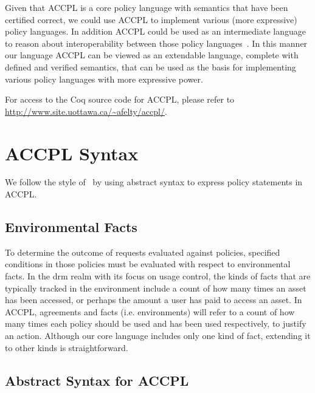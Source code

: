 \documentclass[runningheads,a4paper]{llncs}
\begin{document}
Given that \ac{ACCPL} is a core policy language with semantics that have been certified correct, we could use \ac{ACCPL} to implement various (more expressive) policy languages. In addition \ac{ACCPL} could be used as an intermediate language to reason about interoperability between those policy languages~\cite{prados2005interoperability,maronas2009architecture}. In this manner our language \ac{ACCPL} can be viewed as an extendable language, complete with defined and verified semantics, that can be used as the basis for implementing various policy languages with more expressive power. 

For access to the Coq source code for \ac{ACCPL}, please refer to \url{http://www.site.uottawa.ca/~afelty/accpl/}.

\section{ACCPL Syntax}

We follow the style of~\cite{pucella2006} by using abstract syntax to express policy statements in \ac{ACCPL}. 

\subsection{Environmental Facts}\label{sec:odrl0}
To determine the outcome of requests evaluated against policies,
specified conditions in those policies must be evaluated with respect
to environmental facts. In the \ac{drm} realm with its focus on usage
control, the kinds of facts that are typically tracked in the
environment include a count of how many times an asset has been
accessed, or perhaps the amount a user has paid to access an asset. In \ac{ACCPL}, agreements and facts (i.e. environments) will
refer to a count of how many times each policy should be used and has
been used respectively, to justify an action.
Although our core language includes only one kind of fact, extending
it to other kinds is straightforward.

\subsection{Abstract Syntax for ACCPL} \label{sec:productionast}
\end{document}
